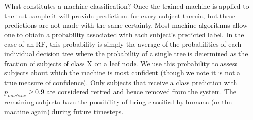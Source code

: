 \documentclass[twocolumn]{aastex6}
\begin{document}
What constitutes a machine classification? Once the trained machine is applied to
the test sample it will provide predictions for every subject therein, but these predictions
are not made with the same certainty. Most machine algorithms allow one to obtain
a probability associated with each subject's predicted label. 
In the case of an RF, this probability is simply the average of the probabilities of each 
individual decision tree where the probability of a single tree is determined as the fraction
of subjects of class X on a leaf node.  We use this probability to assess subjects about which
the machine is most confident (though we note it is not a true measure of confidence).
Only subjects that receive a class prediction with $p_{machine} \ge 0.9$ are considered
retired and hence removed from the system. The remaining subjects have the possibility 
of being classified by humans (or the machine again) during future timesteps. 



\end{document}
